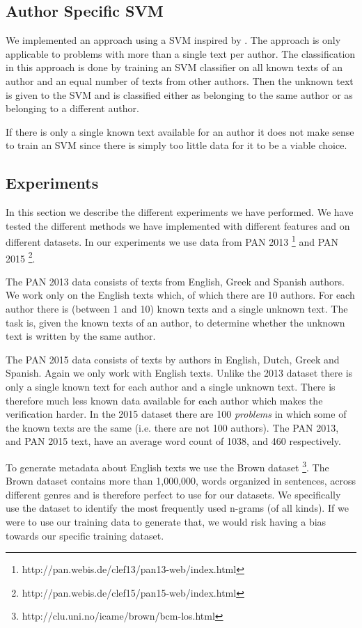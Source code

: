 \subsection{Author Specific SVM} \label{subsec:method:author_specific_svm}
We implemented an approach using a \gls{SVM} inspired by \cite{hansen2014}. The
approach is only applicable to problems with more than a single text per author.
The classification in this approach is done by training an \gls{SVM} classifier
on all known texts of an author and an equal number of texts from other authors.
Then the unknown text is given to the \gls{SVM} and is classified either as
belonging to the same author or as belonging to a different author.

If there is only a single known text available for an author it does not make
sense to train an \gls{SVM} since there is simply too little data for it
to be a viable choice.

\subsection{Experiments} \label{subsec:method:experiments}
In this section we describe the different experiments we have performed.
We have tested the different methods we have implemented with different
features and on different datasets. In our experiments we use data from PAN
2013 \footnote{http://pan.webis.de/clef13/pan13-web/index.html} and PAN 2015
\footnote{http://pan.webis.de/clef15/pan15-web/index.html}.

The PAN 2013 data consists of texts from English, Greek and Spanish authors. We
work only on the English texts which, of which there are 10 authors. For each
author there is (between 1 and 10) known texts and a single unknown text. The
task is, given the known texts of an author, to determine whether the unknown
text is written by the same author.

The PAN 2015 data consists of texts by authors in English, Dutch, Greek and
Spanish. Again we only work with English texts. Unlike the 2013 dataset there
is only a single known text for each author and a single unknown text. There
is therefore much less known data available for each author which makes the
verification harder. In the 2015 dataset there are 100 \textit{problems} in
which some of the known texts are the same (i.e. there are not 100 authors).
The PAN 2013, and PAN 2015 text, have an average word count of 1038, and 460
respectively.

To generate metadata about English texts we use the Brown dataset
\footnote{http://clu.uni.no/icame/brown/bcm-los.html}. The Brown dataset
contains more than 1,000,000, words organized in sentences, across different
genres and is therefore perfect to use for our datasets. We specifically use the
dataset to identify the most frequently used n-grams (of all kinds). If we were
to use our training data to generate that, we would risk having a bias towards
our specific training dataset.

